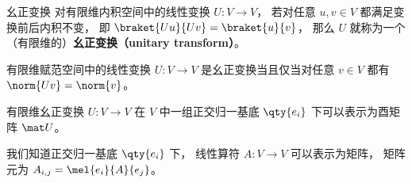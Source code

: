 
\begin{issues}
\issueDraft
\end{issues}


\begin{definition}{幺正变换}
对有限维内积空间中的线性变换 $U: V\to V$， 若对任意 $u, v \in V$ 都满足变换前后内积不变， 即 $\braket{Uu}{Uv} = \braket{u}{v}$， 那么 $U$ 就称为一个（有限维的）\textbf{幺正变换（unitary transform）}。
\end{definition}

\begin{theorem}{}
有限维赋范空间中的线性变换 $U: V\to V$ 是幺正变换当且仅当对任意 $v\in V$ 都有 $\norm{Uv} = \norm{v}$。
\end{theorem}

\begin{theorem}{}
有限维幺正变换 $U: V\to V$ 在 $V$ 中一组正交归一基底 $\qty{e_i}$ 下可以表示为酉矩阵 $\mat U$。
\end{theorem}
我们知道正交归一基底 $\qty{e_i}$ 下， 线性算符 $A:V\to V$ 可以表示为矩阵， 矩阵元为%
$A_{i,j} = \mel{e_i}{A}{e_j}$。
